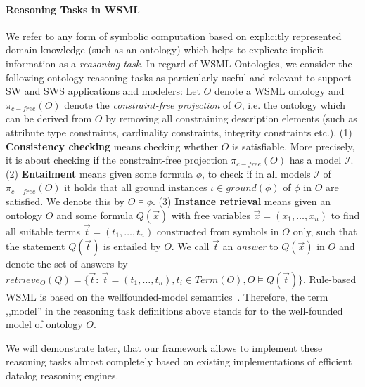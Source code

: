 \paragraph{\small Reasoning Tasks in WSML --}
We refer to any form of symbolic computation based on explicitly
represented domain knowledge (such as an ontology) which helps
to explicate implicit information as a \emph{reasoning task}.
In regard of WSML Ontologies, we consider the following
ontology reasoning tasks as particularly useful and relevant to support SW and SWS applications and
modelers:
Let $O$ denote a WSML ontology and $\pi_{c-free}(O)$ denote the \emph{constraint-free projection} of $O$, i.e. the
ontology which can be derived from $O$ by removing all constraining description
elements (such as attribute type constraints, cardinality constraints, integrity constraints etc.).
(1) {\bf Consistency checking} means checking whether $O$ is satisfiable. More precisely, it is about checking
if the constraint-free projection $\pi_{c-free}(O)$ has a model $\mathcal{I}$.
(2) {\bf Entailment} means given some formula $\phi$,
to check if in all models $\mathcal{I}$ of $\pi_{c-free}(O)$ it holds that all ground instances
$\iota \in ground(\phi)$ of $\phi$ in $O$ are satisfied. We denote
this by $O \models \phi$.
(3) {\bf Instance retrieval} means given an ontology $O$ and some formula $Q(\vec{x})$
with free variables $\vec{x} = (x_1,\ldots,x_n)$ to find all suitable
terms $\vec{t} = (t_1,\ldots,t_n)$ constructed from symbols in $O$ only,
such that the statement $Q(\vec{t})$ is entailed by $O$.
We call $\vec{t}$ an \emph{answer} to $Q(\vec{x})$ in $O$ and denote
the set of answers by $retrieve_O(Q) = \{\vec{t} : \, \vec{t} = (t_1, \ldots, t_n), t_i \in Term(O), O \models
Q(\vec{t})\}$. Rule-based WSML is based on the wellfounded-model
semantics~\cite{Gelder+RossETAL-WellSemaGeneLogi:91}. Therefore, the term ,,model'' in the reasoning task definitions above stands for to the well-founded model of ontology
$O$.



We will demonstrate later, that our framework allows to implement
these reasoning tasks almost completely based on existing
implementations of efficient datalog reasoning engines.
